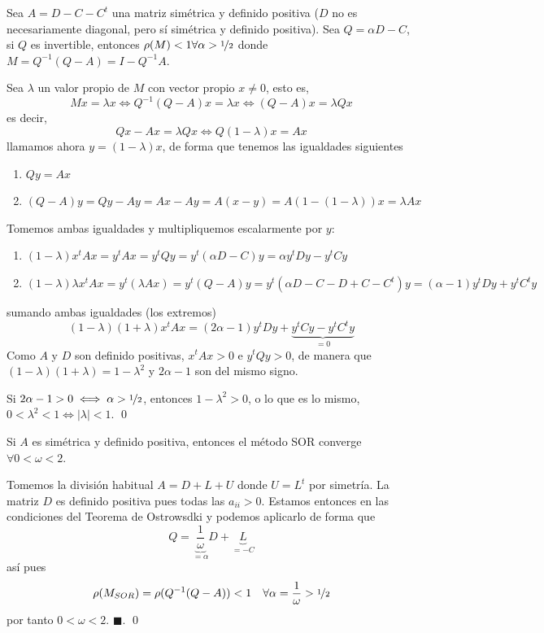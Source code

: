     \begin{teo} 
        Sea $A=D-C-C^t$ una matriz simétrica y definido positiva ($D$ no es necesariamente diagonal, pero sí simétrica y definido positiva). Sea $Q=\alpha D-C$, si $Q$ es invertible, entonces $\rho(M)< 1 \forall \alpha > \nicefrac{1}{2}$ donde $M=Q^{-1}(Q-A)=I-Q^{-1}A$. 
    \end{teo}
    \begin{dem}
        Sea $\lambda$ un valor propio de $M$ con vector propio $x \neq 0$, esto es, 
        $$Mx=\lambda x \iff Q^{-1}(Q-A)x=\lambda x \iff (Q-A)x=\lambda Qx$$
        es decir,
        $$Qx-Ax=\lambda Q x \iff Q(1-\lambda)x=Ax$$
        llamamos ahora $y=(1-\lambda)x$, de forma que tenemos las igualdades siguientes
        \begin{enumerate}
            \item $Qy=Ax$
            \item $(Q-A)y=Qy-Ay=Ax-Ay=A(x-y)=A(1-(1-\lambda))x=\lambda A x$
        \end{enumerate}
        Tomemos ambas igualdades y multipliquemos escalarmente por $y$:
        \begin{enumerate}
            \item $(1-\lambda)x^t A x = y^t A x= y^t Q y = y^t (\alpha D-C) y = \alpha y^t D y - y^t C y$
            \item $(1-\lambda)\lambda x^t A x= y^t (\lambda A x)= y^t (Q-A) y =y^t (\alpha D-C - D +C -C^t) y=(\alpha-1)y^t D y +y^t C^t y$
        \end{enumerate}
        sumando ambas igualdades (los extremos)
        $$ (1-\lambda)(1+\lambda) x^t A x= (2\alpha-1) y^t D y + \underbrace{y^t C y - y^t C^t y}_{=0}$$
        Como $A$ y $D$ son definido positivas, $x^tAx > 0 $ e $y^t Q y > 0$, de manera que $(1-\lambda)(1+\lambda)=1-\lambda^2$ y $2\alpha-1$ son del mismo signo. 

        Si $2\alpha-1>0 \iff \alpha> \nicefrac{1}{2}$, entonces $1-\lambda^2 > 0$, o lo que es lo mismo, $0 < \lambda^2 < 1 \iff |\lambda| < 1$.
    \qed\end{dem}
    \begin{cor}
        Si $A$ es simétrica y definido positiva, entonces el método SOR converge $\forall 0 < \omega < 2$. 
    \end{cor}
    \begin{dem}
        Tomemos la división habitual $A=D+L+U$ donde $U=L^t$ por simetría. La matriz $D$ es definido positiva pues todas las $a_{ii} > 0$. Estamos entonces en las condiciones del Teorema de Ostrowsdki y podemos aplicarlo de forma que
        $$Q=\underbrace{\dfrac{1}{\omega}}_{=\alpha}D+\underbrace{L}_{=-C}$$
        así pues 
        $$\rho(M_{SOR})=\rho(Q^{-1}(Q-A))<1 \quad \forall \alpha = \dfrac{1}{\omega}> \nicefrac{1}{2}$$
        por tanto $0 < \omega < 2$. \hfill $\blacksquare.$
    \qed\end{dem}
